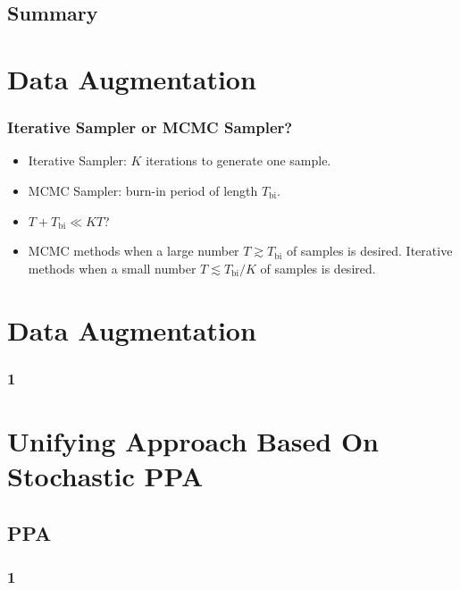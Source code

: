 \documentclass[aspectratio=169]{beamer}
\begin{document}
\subsection{Summary}
\section{Data Augmentation}
\begin{frame}
\frametitle{Iterative Sampler or MCMC Sampler?}
\begin{itemize}
\item Iterative Sampler: $K$ iterations to generate one sample. 
\item MCMC Sampler: burn-in period of length $T_{\text{bi}}$.
\item $T + T_{\text{bi}} \ll KT$?
\item MCMC methods when a large number $T\gtrsim T_{\text{bi}}$ of samples is desired. Iterative methods when a small number $T\lesssim T_{\text{bi}}/K$ of samples is desired.
\end{itemize}
\end{frame}

\section{Data Augmentation}
\begin{frame}
\frametitle{1}
\end{frame}

\section{Unifying Approach Based On Stochastic PPA}
\subsection{PPA}
\begin{frame}
\frametitle{1}
\end{frame}
\end{document}
